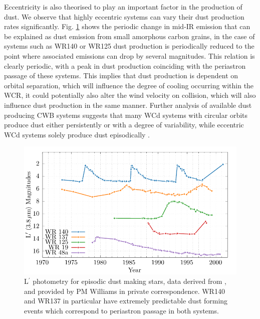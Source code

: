 Eccentricity is also theorised to play an important factor in the production of dust.
We observe that highly eccentric systems can vary their dust production rates significantly.
Fig. \ref{fig:periodicmags} shows the periodic change in mid-IR emission that can be explained as dust emission from small amorphous carbon grains, in the case of systems such as WR140 or WR125 dust production is periodically reduced to the point where associated emissions can drop by several magnitudes.
This relation is clearly periodic, with a peak in dust production coinciding with the periastron passage of these systems.
This implies that dust production is dependent on orbital separation, which will influence the degree of cooling occurring within the WCR, it could potentially also alter the wind velocity on collision, which will also influence dust production in the same manner.
Further analysis of available dust producing CWB systems suggests that many WCd systems with circular orbits produce dust either persistently or with a degree of variability, while eccentric WCd systems solely produce dust episodically \parencite{crowther_dust_2003,williamsVariableDustEmission2019}.

\begin{figure}[h]
  \centering
  \includegraphics[]{assets/magnitudes/magnitudes-new.pdf}
  \caption[L$^\prime$ photometry of episodic dust making stars]{ L$^\prime$ photometry for episodic dust making stars, data derived from \textcite{crowther_dust_2003}, and provided by PM Williams in private correspondence. WR140 and WR137 in particular have extremely predictable dust forming events which correspond to periastron passage in both systems.}
  \label{fig:periodicmags}
\end{figure}

